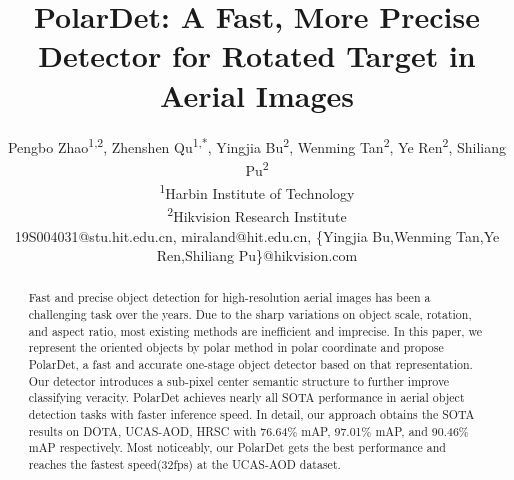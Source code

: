 \documentclass[10pt,twocolumn]{article}
\begin{document}
\title{PolarDet: A Fast, More Precise Detector for Rotated Target in Aerial Images}

\author{Pengbo Zhao\textsuperscript{\rm 1,2},
	Zhenshen Qu\textsuperscript{\rm 1,*},
	Yingjia Bu\textsuperscript{\rm 2},
	Wenming Tan\textsuperscript{\rm 2},
	Ye Ren\textsuperscript{\rm 2},
	Shiliang Pu\textsuperscript{\rm 2} \\
	\textsuperscript{\rm 1}Harbin Institute of Technology \\
	\textsuperscript{\rm 2}Hikvision Research Institute \\
	19S004031@stu.hit.edu.cn, miraland@hit.edu.cn, \{Yingjia Bu,Wenming Tan,Ye Ren,Shiliang Pu\}@hikvision.com
}

\maketitle
\thispagestyle{empty}

\begin{abstract}
Fast and precise object detection for high-resolution aerial images has been a challenging task over the years. Due to the sharp variations on object scale, rotation, and aspect ratio, most existing methods are inefficient and imprecise. In this paper, we represent the oriented objects by polar method in polar coordinate and propose PolarDet, a fast and accurate one-stage object detector based on that representation. Our detector introduces a sub-pixel center semantic structure to further improve classifying veracity. PolarDet achieves nearly all SOTA performance in aerial object detection tasks with faster inference speed. In detail, our approach obtains the SOTA results on DOTA, UCAS-AOD, HRSC with 76.64\% mAP, 97.01\% mAP, and 90.46\% mAP respectively. Most noticeably, our PolarDet gets the best performance and reaches the fastest speed(32fps) at the UCAS-AOD dataset.
\end{abstract}
\end{document}
